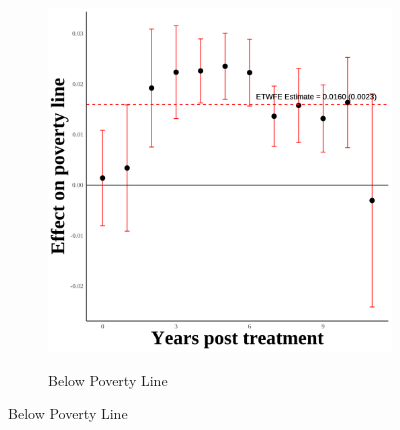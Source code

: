 \documentclass[12pt,english]{article}
\begin{document}
\begin{figure}[H]
\begin{subfigure}[b]{0.3\textwidth}
    \label{fig:snap-third}
  \end{subfigure}
  \hfill
  \begin{subfigure}[b]{0.3\textwidth}
    \centering
    \caption{Below Poverty Line}
    \includegraphics[width=\linewidth]{figures/plot54-poverty_line_event_study-third.png}
    \label{fig:poverty-line-third}
  \end{subfigure}

  \vspace{0.3cm} %


\end{figure}
\end{document}
